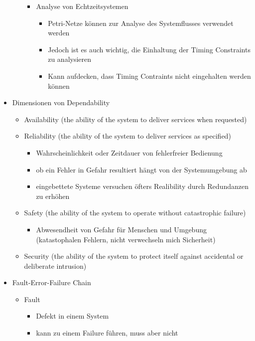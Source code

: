 \documentclass[paper=a4, fontsize=11pt]{scrartcl} %
\numberwithin{equation}{section} %
\numberwithin{figure}{section} %
\numberwithin{table}{section} %
\begin{document}
\begin{itemize}
\begin{itemize}
\begin{itemize}
\begin{itemize}
      \end{itemize}
      \item Analyse von Echtzeitsystemen
      \begin{itemize}
        \item Petri-Netze können zur Analyse des Systemflusses verwendet werden
        \item Jedoch ist es auch wichtig, die Einhaltung der Timing Constraints zu analysieren
        \item Kann aufdecken, dass Timing Contraints nicht eingehalten werden können
      \end{itemize}
    \end{itemize}
  \end{itemize}
  \item Dimensionen von Dependability
  \begin{itemize}
    \item Availability (the ability of the system to deliver services when requested)
    \item Reliability (the ability of the system to deliver services as specified)
    \begin{itemize}
      \item Wahrscheinlichkeit oder Zeitdauer von fehlerfreier Bedienung
      \item ob ein Fehler in Gefahr resultiert hängt von der Systemumgebung ab
      \item eingebettete Systeme versuchen öfters Realibility durch Redundanzen zu erhöhen
    \end{itemize}
    \item Safety (the ability of the system to operate without catastrophic failure)
    \begin{itemize}
      \item Abwesendheit von Gefahr für Menschen und Umgebung (katastophalen Fehlern, nicht verwechseln mich Sicherheit)
    \end{itemize}
    \item Security (the ability of the system to protect itself against accidental or deliberate intrusion)
  \end{itemize}
  \item Fault-Error-Failure Chain
  \begin{itemize}
    \item Fault
    \begin{itemize}
      \item Defekt in einem System
      \item kann zu einem Failure führen, muss aber nicht

\end{itemize}
\end{itemize}
\end{itemize}
\end{document}
